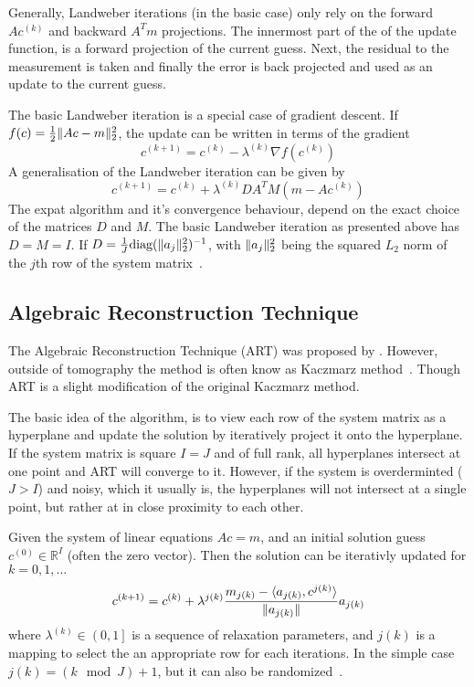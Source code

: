 Generally, Landweber iterations (in the basic case) only rely on the forward \(Ac^{(k)}\) and backward
\(A^T m\) projections. The innermost part of the of the update function, is a forward projection of the
current guess. Next, the residual to the measurement is taken and finally the error is back
projected and used as an update to the current guess.

The basic Landweber iteration is a special case of gradient descent. If \(f(c) = \frac{1}{2}
\lVert Ac - m\rVert_2^2\), the update can be written in terms of the gradient
\[
	c^{(k+1)} = c^{(k)} - \lambda^{(k)} \nabla f(c^{(k)})
\]
A generalisation of the Landweber iteration can be given by
\[
	c^{(k+1)} = c^{(k)} + \lambda^{(k)} DA^TM(m - Ac^{(k)})
\]
The expat algorithm and it's convergence behaviour, depend on the exact choice of the matrices \(D\)
and \(M\). The basic Landweber iteration as presented above has \(D = M = I\). If \(D = \frac{1}{J}
\text{diag}(\lVert a_j\rVert^2_2)^{-1}\), with \(\lVert a_j\rVert^2_2\) being the squared \(L_2\) norm of the
\(j\)th row of the system matrix~\cite[chap 6.2]{hansen_discrete_2010}.

\subsection{Algebraic Reconstruction Technique}\label{subsec:algebraic_reconstruction_technique}

The Algebraic Reconstruction Technique (ART) was proposed by
\citeauthor{gordon_algebraic_1970}\cite{gordon_algebraic_1970}. However, outside of tomography the
method is often know as Kaczmarz method~\cite{kaczmarz_approximate_1993}. Though ART is a slight
modification of the original Kaczmarz method.

The basic idea of the algorithm, is to view each row of the system matrix as a hyperplane and update
the solution by iteratively project it onto the hyperplane. If the system matrix is square \(I = J\)
and of full rank, all hyperplanes intersect at one point and ART will converge to it. However, if
the system is overderminted (\(J > I\)) and noisy, which it usually is, the hyperplanes will not
intersect at a single point, but rather at in close proximity to each other.

\begin{definition}\label{def:art}
	Given the system of linear equations \(Ac = m\), and an initial solution guess \(c^{(0)} \in
	\mathbb{R}^I\) (often the zero vector). Then the solution can be iterativly updated for
	\(k = 0, 1, \dots\)
	\[
		c^{(k+1)} = c^{(k)} + \lambda^{j(k)} \frac{m_{j(k)} - \langle a_{j(k)}, c^{j(k)} \rangle}{\lVert a_{j(k)}\rVert}a_{j(k)}
	\]
	where \(\lambda^{(k)} \in \left(0, 1\right]\) is a sequence of relaxation parameters, and
	\(j(k)\) is a mapping to select the an appropriate row for each iterations. In the simple
	case \(j(k) = (k \mod J) + 1\), but it can also be
	randomized~\cite{strohmer_randomized_2007}.
\end{definition}

